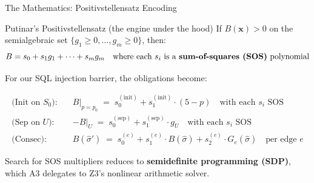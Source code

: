 \documentclass[aspectratio=169]{beamer}
\begin{document}
\begin{frame}{The Mathematics: Positivstellensatz Encoding}
\begin{block}{Putinar's Positivstellensatz (the engine under the hood)}
If $B(\mathbf{x}) > 0$ on the semialgebraic set $\{g_1 \ge 0, \ldots, g_m \ge 0\}$, then:
\[
  B = s_0 + s_1 g_1 + \cdots + s_m g_m
  \quad\text{where each $s_i$ is a \textbf{sum-of-squares (SOS)} polynomial}
\]
\end{block}

\vspace{0.3em}
For our SQL injection barrier, the obligations become:

\begin{align}
  \text{(Init on $S_0$):}\quad & B\big|_{p=p_0} \;=\; s_0^{(\mathrm{init})} + s_1^{(\mathrm{init})} \cdot (5 - p)
    \quad\text{with each $s_i$ SOS} \label{eq:sos-init}\\[6pt]
  \text{(Sep on $U$):}\quad & -B\big|_U \;=\; s_0^{(\mathrm{sep})} + s_1^{(\mathrm{sep})} \cdot g_U
    \quad\text{with each $s_i$ SOS} \label{eq:sos-sep}\\[6pt]
  \text{(Consec):}\quad & B(\hat\sigma') \;=\; s_0^{(e)} + s_1^{(e)} \cdot B(\hat\sigma)
    + s_2^{(e)} \cdot G_e(\hat\sigma)
    \quad\text{per edge $e$} \label{eq:sos-consec}
\end{align}

\vspace{0.3em}
Search for SOS multipliers reduces to \textbf{semidefinite programming (SDP)},
which A3 delegates to Z3's nonlinear arithmetic solver.
\end{frame}
\end{document}
